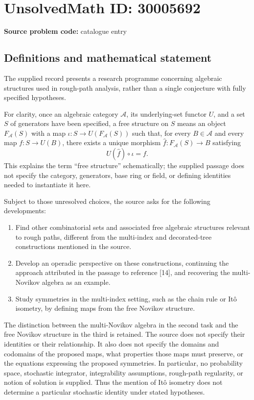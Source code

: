 \documentclass[11pt]{article}
\begin{document}
\section*{UnsolvedMath ID: 30005692}
\textbf{Source problem code:} catalogue entry
\subsection{Definitions and mathematical statement}
The supplied record presents a research programme concerning algebraic structures used in rough-path analysis, rather than a single conjecture with fully specified hypotheses.

For clarity, once an algebraic category \(\mathcal A\), its underlying-set functor \(U\), and a set \(S\) of generators have been specified, a free structure on \(S\) means an object \(F_{\mathcal A}(S)\) with a map \(\iota:S\to U(F_{\mathcal A}(S))\) such that, for every \(B\in\mathcal A\) and every map \(f:S\to U(B)\), there exists a unique morphism \(\widehat f:F_{\mathcal A}(S)\to B\) satisfying
\[
U(\widehat f)\circ\iota=f.
\]
This explains the term ``free structure'' schematically; the supplied passage does not specify the category, generators, base ring or field, or defining identities needed to instantiate it here.

Subject to those unresolved choices, the source asks for the following developments:
\begin{enumerate}
\item Find other combinatorial sets and associated free algebraic structures relevant to rough paths, different from the multi-index and decorated-tree constructions mentioned in the source.
\item Develop an operadic perspective on these constructions, continuing the approach attributed in the passage to reference [14], and recovering the multi-Novikov algebra as an example.
\item Study symmetries in the multi-index setting, such as the chain rule or It\^o isometry, by defining maps from the free Novikov structure.
\end{enumerate}

The distinction between the multi-Novikov algebra in the second task and the free Novikov structure in the third is retained. The source does not specify their identities or their relationship. It also does not specify the domains and codomains of the proposed maps, what properties those maps must preserve, or the equations expressing the proposed symmetries. In particular, no probability space, stochastic integrator, integrability assumptions, rough-path regularity, or notion of solution is supplied. Thus the mention of It\^o isometry does not determine a particular stochastic identity under stated hypotheses.
\end{document}
